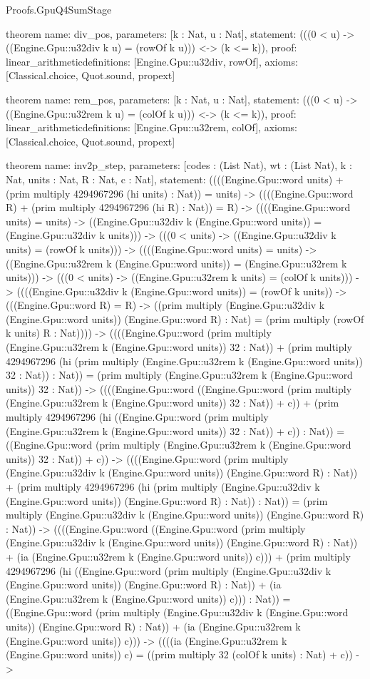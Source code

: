 \begin{lexlean}{Proofs.GpuQ4SumStage}
\begin{semanticmodule}
theorem{
  name: div_pos,
  parameters: [k : Nat, u : Nat],
  statement: (((0 < u) -> ((Engine.Gpu::u32div k u) = (rowOf k u))) <-> (k <= k)),
  proof: linear_arithmetic{definitions: [Engine.Gpu::u32div, rowOf]},
  axioms: [Classical.choice, Quot.sound, propext]
}

theorem{
  name: rem_pos,
  parameters: [k : Nat, u : Nat],
  statement: (((0 < u) -> ((Engine.Gpu::u32rem k u) = (colOf k u))) <-> (k <= k)),
  proof: linear_arithmetic{definitions: [Engine.Gpu::u32rem, colOf]},
  axioms: [Classical.choice, Quot.sound, propext]
}

theorem{
  name: inv2p_step,
  parameters: [codes : (List Nat), wt : (List Nat), k : Nat, units : Nat, R : Nat, c : Nat],
  statement: ((((Engine.Gpu::word units) + (prim multiply 4294967296 (hi units) : Nat)) = units) -> ((((Engine.Gpu::word R) + (prim multiply 4294967296 (hi R) : Nat)) = R) -> ((((Engine.Gpu::word units) = units) -> ((Engine.Gpu::u32div k (Engine.Gpu::word units)) = (Engine.Gpu::u32div k units))) -> (((0 < units) -> ((Engine.Gpu::u32div k units) = (rowOf k units))) -> ((((Engine.Gpu::word units) = units) -> ((Engine.Gpu::u32rem k (Engine.Gpu::word units)) = (Engine.Gpu::u32rem k units))) -> (((0 < units) -> ((Engine.Gpu::u32rem k units) = (colOf k units))) -> ((((Engine.Gpu::u32div k (Engine.Gpu::word units)) = (rowOf k units)) -> (((Engine.Gpu::word R) = R) -> ((prim multiply (Engine.Gpu::u32div k (Engine.Gpu::word units)) (Engine.Gpu::word R) : Nat) = (prim multiply (rowOf k units) R : Nat)))) -> ((((Engine.Gpu::word (prim multiply (Engine.Gpu::u32rem k (Engine.Gpu::word units)) 32 : Nat)) + (prim multiply 4294967296 (hi (prim multiply (Engine.Gpu::u32rem k (Engine.Gpu::word units)) 32 : Nat)) : Nat)) = (prim multiply (Engine.Gpu::u32rem k (Engine.Gpu::word units)) 32 : Nat)) -> ((((Engine.Gpu::word ((Engine.Gpu::word (prim multiply (Engine.Gpu::u32rem k (Engine.Gpu::word units)) 32 : Nat)) + c)) + (prim multiply 4294967296 (hi ((Engine.Gpu::word (prim multiply (Engine.Gpu::u32rem k (Engine.Gpu::word units)) 32 : Nat)) + c)) : Nat)) = ((Engine.Gpu::word (prim multiply (Engine.Gpu::u32rem k (Engine.Gpu::word units)) 32 : Nat)) + c)) -> ((((Engine.Gpu::word (prim multiply (Engine.Gpu::u32div k (Engine.Gpu::word units)) (Engine.Gpu::word R) : Nat)) + (prim multiply 4294967296 (hi (prim multiply (Engine.Gpu::u32div k (Engine.Gpu::word units)) (Engine.Gpu::word R) : Nat)) : Nat)) = (prim multiply (Engine.Gpu::u32div k (Engine.Gpu::word units)) (Engine.Gpu::word R) : Nat)) -> ((((Engine.Gpu::word ((Engine.Gpu::word (prim multiply (Engine.Gpu::u32div k (Engine.Gpu::word units)) (Engine.Gpu::word R) : Nat)) + (ia (Engine.Gpu::u32rem k (Engine.Gpu::word units)) c))) + (prim multiply 4294967296 (hi ((Engine.Gpu::word (prim multiply (Engine.Gpu::u32div k (Engine.Gpu::word units)) (Engine.Gpu::word R) : Nat)) + (ia (Engine.Gpu::u32rem k (Engine.Gpu::word units)) c))) : Nat)) = ((Engine.Gpu::word (prim multiply (Engine.Gpu::u32div k (Engine.Gpu::word units)) (Engine.Gpu::word R) : Nat)) + (ia (Engine.Gpu::u32rem k (Engine.Gpu::word units)) c))) -> ((((ia (Engine.Gpu::u32rem k (Engine.Gpu::word units)) c) = ((prim multiply 32 (colOf k units) : Nat) + c)) -> }
\end{semanticmodule}
\end{lexlean}
